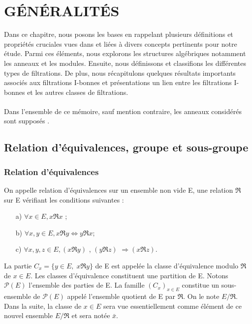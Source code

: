 \chapter{GÉNÉRALITÉS}
Dans ce chapitre, nous posons les bases en rappelant plusieurs définitions et propriétés cruciales vues dans \cite{Di2} et liées à divers concepts pertinents pour notre étude. Parmi ces éléments,
nous explorons les structures algébriques notamment les anneaux et les modules. Ensuite, nous définissons et classifions les différentes types de filtrations. De plus, nous récapitulons quelques résultats importants associés aux filtrations I-bonnes et présentations un lien entre les filtrations I-bonnes et les autres classes de filtrations. \\\\ Dans l'ensemble de ce mémoire, sauf mention contraire, les anneaux considérés sont supposés .
\section{Relation d'équivalences, groupe et sous-groupe}
\subsection{Relation d'équivalences}
\begin{madefinition}
	On appelle relation d’équivalences sur un ensemble non vide E, une relation
	$\Re $ sur E vérifiant les conditions suivantes :
	\begin{enumerate}
		\item[a)] $\forall x \in E, x\Re x$ ;
		\item[b)] $\forall x,y \in E, x\Re y \Longleftrightarrow y\Re x $;
		\item[c)] $\forall x,y,z \in E, (x\Re y)$ , $(y\Re z)$ $\Longrightarrow (x\Re z)$.
	\end{enumerate}
	La partie $C_x = \{y \in E,\; x\Re y\}  $ de E est appelée la classe d’équivalence modulo $\Re $ de $x \in E$. Les	classes d’équivalence constituent une partition de E. Notons $\mathcal{P}(E)$ l’ensemble des parties de E. La famille $(C_x)_{x \in E}$ constitue un sous-ensemble de $\mathcal{P}(E)$ appelé l’ensemble quotient de E par $\Re$. On le note $E/\Re $. 
	Dans la suite, la classe de $x \in E$ sera vue essentiellement comme élément de ce nouvel ensemble $E/\Re $ et sera notée $\bar{x}$.
\end{madefinition}
